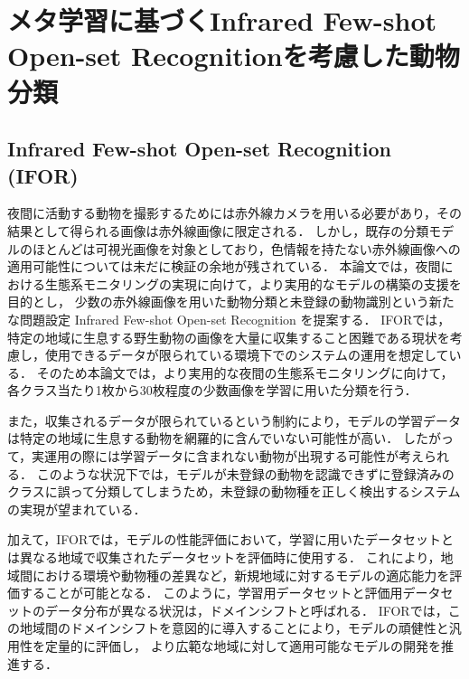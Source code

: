 \documentclass[a4paper,11pt,nomag]{jsreport}
\begin{document}
\setcounter{chapter}{3}

\chapter*{メタ学習に基づくInfrared Few-shot Open-set Recognitionを考慮した動物分類}

\section{Infrared Few-shot Open-set Recognition (IFOR)}
\label{sec:ifor}

夜間に活動する動物を撮影するためには赤外線カメラを用いる必要があり，その結果として得られる画像は赤外線画像に限定される．
しかし，既存の分類モデルのほとんどは可視光画像を対象としており，色情報を持たない赤外線画像への適用可能性については未だに検証の余地が残されている．
本論文では，夜間における生態系モニタリングの実現に向けて，より実用的なモデルの構築の支援を目的とし，
少数の赤外線画像を用いた動物分類と未登録の動物識別という新たな問題設定 Infrared Few-shot Open-set Recognition を提案する．
IFORでは，特定の地域に生息する野生動物の画像を大量に収集すること困難である現状を考慮し，使用できるデータが限られている環境下でのシステムの運用を想定している．
そのため本論文では，より実用的な夜間の生態系モニタリングに向けて，
各クラス当たり1枚から30枚程度の少数画像を学習に用いた分類を行う．

また，収集されるデータが限られているという制約により，モデルの学習データは特定の地域に生息する動物を網羅的に含んでいない可能性が高い．
したがって，実運用の際には学習データに含まれない動物が出現する可能性が考えられる．
このような状況下では，モデルが未登録の動物を認識できずに登録済みのクラスに誤って分類してしまうため，未登録の動物種を正しく検出するシステムの実現が望まれている．


加えて，IFORでは，モデルの性能評価において，学習に用いたデータセットとは異なる地域で収集されたデータセットを評価時に使用する．
これにより，地域間における環境や動物種の差異など，新規地域に対するモデルの適応能力を評価することが可能となる．
このように，学習用データセットと評価用データセットのデータ分布が異なる状況は，ドメインシフトと呼ばれる．
IFORでは，この地域間のドメインシフトを意図的に導入することにより，モデルの頑健性と汎用性を定量的に評価し，
より広範な地域に対して適用可能なモデルの開発を推進する．
\end{document}
